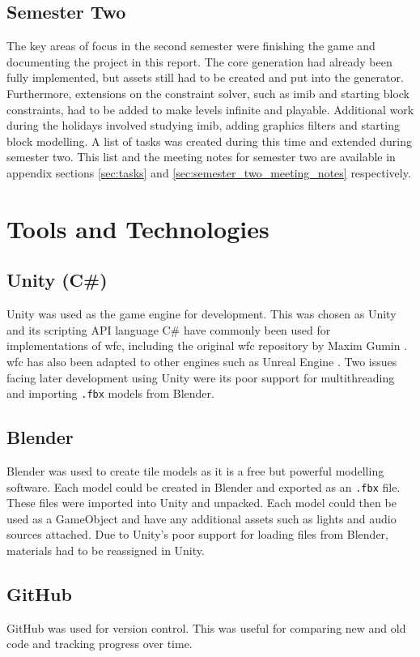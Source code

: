 \subsection{Semester Two}
The key areas of focus in the second semester were finishing the game and documenting the project in this report. The core generation had already been fully implemented, but assets still had to be created and put into the generator. Furthermore, extensions on the constraint solver, such as \acrlong{imib} and starting block constraints, had to be added to make levels infinite and playable. Additional work during the holidays involved studying \acrlong{imib}, adding graphics filters and starting block modelling. A list of tasks was created during this time and extended during semester two. This list and the meeting notes for semester two are available in appendix sections \ref{sec:tasks} and \ref{sec:semester_two_meeting_notes} respectively.

\section{Tools and Technologies}
\subsection{Unity (C\#)}
Unity was used as the game engine for development. This was chosen as Unity and its scripting API language C\# have commonly been used for implementations of \acrlong{wfc}, including the original \acrshort{wfc} repository by Maxim Gumin \cite{Gumin_Wave_Function_Collapse_2016}. \acrshort{wfc} has also been adapted to other engines such as Unreal Engine \cite{unreal_engine_WFC}. Two issues facing later development using Unity were its poor support for multithreading and importing \texttt{.fbx} models from Blender.

\subsection{Blender}
Blender was used to create tile models as it is a free but powerful modelling software. Each model could be created in Blender and exported as an \texttt{.fbx} file. These files were imported into Unity and unpacked. Each model could then be used as a GameObject and have any additional assets such as lights and audio sources attached. Due to Unity's poor support for loading files from Blender, materials had to be reassigned in Unity.

\subsection{GitHub}
GitHub was used for version control. This was useful for comparing new and old code and tracking progress over time.

